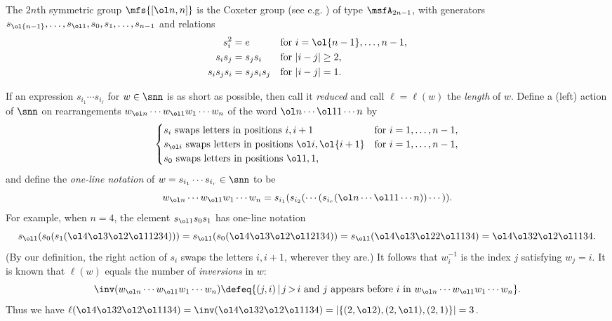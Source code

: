 \label{ss:bnassubgp}
The $2n$th symmetric group
$\mfs{\smash{[\ol n, n]}}$
is the Coxeter group
(see e.g. \cite{BBCoxeter}) of type $\msfA_{2n-1}$,
with generators
  $s_{\ol{n-1}}, \dotsc, s_{\ol 1}, s_0, s_1, \dotsc, s_{n-1}$
and relations
\begin{equation*}
  \begin{alignedat}2
    s_i^2 &= e &\quad &\text{for $i = \ol{n-1}, \dotsc, n-1$,}\\
    s_is_j &= s_js_i &\quad &\text{for $|i-j| \geq 2$,}\\
    s_is_js_i &= s_js_is_j &\quad &\text{for $|i-j| = 1$.}
  \end{alignedat}
\end{equation*}

If an expression $s_{i_1} \cdots s_{i_\ell}$ for $w \in \snn$
is as short as possible,
then call it {\em reduced} and call $\ell = \ell(w)$ the {\em length} of $w$.
Define a (left) action of $\snn$ on rearrangements
$w_{\ol n} \cdots w_{\ol 1} w_1 \cdots w_n$ of the word
$\ol n \cdots \ol 1 1 \cdots n$ by
\begin{equation}\label{eq:laction}
  \begin{cases}
    s_i \text{ swaps letters in positions $i, i+1$}
      &\text{for $i = 1, \dotsc, n-1$},\\
    s_{\ol i} \text{ swaps letters in positions $\ol i, \ol{i+1}$}
      &\text{for $i = 1, \dotsc, n-1$},\\
    s_0 \text{ swaps letters in positions $\ol 1, 1$,}
  \end{cases}
\end{equation}
and
define the {\em one-line notation} of $w = s_{i_1} \cdots s_{i_r} \in \snn$ to be
\begin{equation}\label{eq:s2nrearrange}
  w_{\ol n} \cdots w_{\ol 1} w_1 \cdots w_n 
= s_{i_1}(s_{i_2}( \cdots (s_{i_r}( \ol n \cdots \ol 1 1 \cdots n)) \cdots )).
\end{equation}
For example, when $n=4$, the element $s_{\ol1}s_0s_1$
has one-line notation
\begin{equation*}
    s_{\ol1}(s_0( s_1(\ol4 \ol3 \ol2 \ol1 1234)))
    = s_{\ol1}(s_0(\ol4 \ol3 \ol2 \ol1 2 1 3 4))
    = s_{\ol1}(\ol4 \ol3 \ol2 2 \ol1 1 3 4)
    = \ol4\ol3 2 \ol2 \ol1 1 3 4.
  \end{equation*}
(By our definition, the right action of $s_i$ swaps the letters $i, i+1$,
wherever they are.)
It follows that $w_i^{-1}$ is the index $j$ satisfying $w_j = i$.
It is known that $\ell(w)$ equals the number of {\em inversions} in $w$:
\begin{equation*}
  \inv(w_{\ol n} \cdots w_{\ol1} w_1 \cdots w_n) \defeq
  \{ (j,i) \,|\, j \mkern -2mu > \mkern -2mu i \text{ and $j$ appears before $i$ in $w_{\ol n} \cdots w_{\ol1} w_1 \cdots w_n$} \}.
  \end{equation*}
Thus we have
  $\ell(\ol4\ol32\ol2\ol1134) =
  \inv(\ol4\ol32\ol2\ol1134) =
  |\{(2,\ol2), (2,\ol1), (2,1)\}| = 3$.

